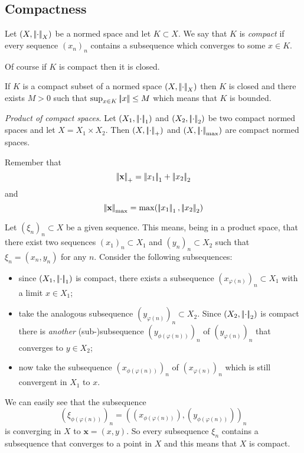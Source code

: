 \documentclass{article}
\begin{document}
\subsection{Compactness}
\begin{definition}
	Let $(X,\left|\negthinspace\left|\cdot\right|\negthinspace\right|_X)$ be a normed space and let $K\subset X$. We say that $K$ is \emph{compact} if every sequence ${(x_n)}_n$ contains a subsequence which converges to some $x\in K$.
\end{definition}Of course if $K$ is compact then it is closed.\begin{lemma}
If $K$ is a compact subset of a normed space $(X,\left|\negthinspace\left|\cdot\right|\negthinspace\right|_X)$ then $K$ is closed and there exists $M>0$ such that $\sup_{x\in K}\left|\negthinspace\left|x\right|\negthinspace\right|\leq M$ which means that $K$ is bounded.
\end{lemma}\begin{proposition}
\emph{Product of compact spaces}. Let $(X_1,\left|\negthinspace\left|\cdot\right|\negthinspace\right|_1)$ and $(X_2,\left|\negthinspace\left|\cdot\right|\negthinspace\right|_2)$ be two compact normed spaces and let $X=X_1\times X_2$. Then $(X,\left|\negthinspace\left|\cdot\right|\negthinspace\right|_+)$ and $(X,\left|\negthinspace\left|\cdot\right|\negthinspace\right|_{\max })$ are compact normed spaces.
\end{proposition}
Remember that 
\begin{equation*}
	\left|\negthinspace\left|\mathbf{x}\right|\negthinspace\right|_+=\left|\negthinspace\left|x_1\right|\negthinspace\right|_1+\left|\negthinspace\left|x_2\right|\negthinspace\right|_2
\end{equation*}
and
\begin{equation*}
	\left|\negthinspace\left|\mathbf{x}\right|\negthinspace\right|_{\max}=\max(\left|\negthinspace\left|x_1\right|\negthinspace\right|_1,\left|\negthinspace\left|x_2\right|\negthinspace\right|_2)
\end{equation*}
\begin{fancyproof}
	Let ${(\xi_{n})}_{n}\subset X$ be a given sequence. This means, being in a product space, that there exist two sequences ${(x_{1})}_{n}\subset X_{1}$ and ${(y_{n})}_{n}\subset X_{2}$ such that $\xi_{n}=(x_{n},y_{n})$ for any $n$. Consider the following subsequences:
	\begin{itemize}
		\item since $(X_1,\left|\negthinspace\left|\cdot\right|\negthinspace\right|_1)$ is compact, there exists a subsequence ${(x_{\varphi(n)})}_{n}\subset X_1$ with a limit $x\in X_{1}$;
		\item take the analogous subsequence ${(y_{\varphi(n)})}_{n}\subset X_2$. Since $(X_2,\left|\negthinspace\left|\cdot\right|\negthinspace\right|_2)$ is compact there is \textit{another} (sub-)subsequence ${(y_{\phi(\varphi(n))})}_{n}$ of ${(y_{\varphi(n)})}_{n}$ that converges to $y\in X_{2}$;
		\item now take the subsequence  ${(x_{\phi(\varphi(n))})}_{n}$ of ${(x_{\varphi(n)})}_{n}$ which is still convergent in $X_{1}$ to $x$.
	\end{itemize}
	We can easily see that the subsequence
	\begin{equation*}
		{(\xi_{\phi(\varphi(n))})}_{n}={\left((x_{\phi(\varphi(n))}),(y_{\phi(\varphi(n))})\right)}_{n}
	\end{equation*}
	is converging in $X$ to $\mathbf{x}=(x,y)$. So every subsequence $\xi_{n}$ contains a subsequence that converges to a point in $X$ and this means that $X$ is compact.
\end{fancyproof}
\end{document}
